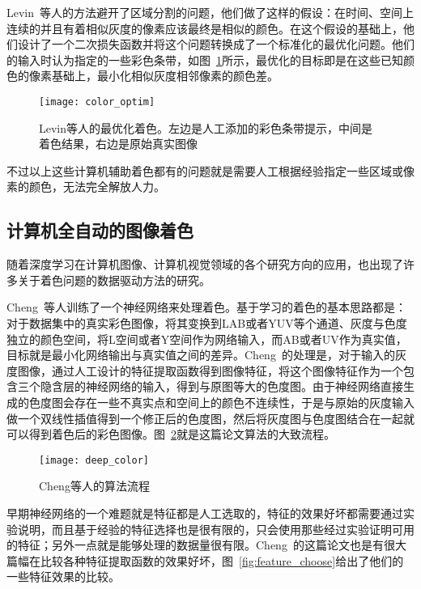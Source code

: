  Levin~\cite{journals/tog/LevinLW04}等人的方法避开了区域分割的问题，他们做了这样的假设：在时间、空间上连续的并且有着相似灰度的像素应该最终是相似的颜色。在这个假设的基础上，他们设计了一个二次损失函数并将这个问题转换成了一个标准化的最优化问题。他们的输入时认为指定的一些彩色条带，如图~\ref{fig:color_optim}所示，最优化的目标即是在这些已知颜色的像素基础上，最小化相似灰度相邻像素的颜色差。

  \begin{figure}[H]
    \centering
    \texttt{[image: color\_optim]}
    \caption[Levin等人的最优化着色]{Levin等人的最优化着色。左边是人工添加的彩色条带提示，中间是着色结果，右边是原始真实图像}
    \label{fig:color_optim}
  \end{figure}

  不过以上这些计算机辅助着色都有的问题就是需要人工根据经验指定一些区域或像素的颜色，无法完全解放人力。

\subsection{计算机全自动的图像着色}
\label{sec:2-automatic-color}

  随着深度学习在计算机图像、计算机视觉领域的各个研究方向的应用，也出现了许多关于着色问题的数据驱动方法的研究。

  Cheng~\cite{DBLP:journals/corr/ChengYS16}等人训练了一个神经网络来处理着色。基于学习的着色的基本思路都是：对于数据集中的真实彩色图像，将其变换到LAB或者YUV等个通道、灰度与色度独立的颜色空间，将L空间或者Y空间作为网络输入，而AB或者UV作为真实值，目标就是最小化网络输出与真实值之间的差异。Cheng~\cite{DBLP:journals/corr/ChengYS16}的处理是，对于输入的灰度图像，通过人工设计的特征提取函数得到图像特征，将这个图像特征作为一个包含三个隐含层的神经网络的输入，得到与原图等大的色度图。由于神经网络直接生成的色度图会存在一些不真实点和空间上的颜色不连续性，于是与原始的灰度输入做一个双线性插值得到一个修正后的色度图，然后将灰度图与色度图结合在一起就可以得到着色后的彩色图像。图~\ref{fig:deep_color}就是这篇论文算法的大致流程。

  \begin{figure}[H]
    \centering
    \texttt{[image: deep\_color]}
    \caption{Cheng等人的算法流程}
    \label{fig:deep_color}
  \end{figure}

  早期神经网络的一个难题就是特征都是人工选取的，特征的效果好坏都需要通过实验说明，而且基于经验的特征选择也是很有限的，只会使用那些经过实验证明可用的特征；另外一点就是能够处理的数据量很有限。Cheng~\cite{DBLP:journals/corr/ChengYS16}的这篇论文也是有很大篇幅在比较各种特征提取函数的效果好坏，图~\ref{fig:feature_choose}给出了他们的一些特征效果的比较。

